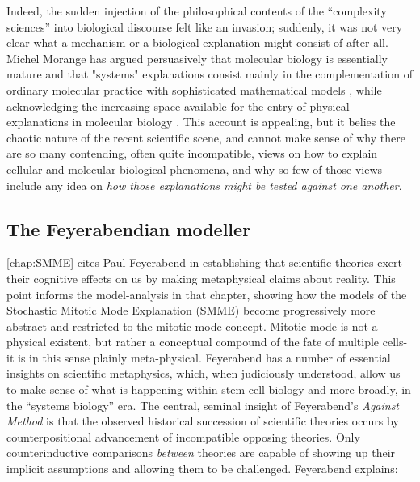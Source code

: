 Indeed, the sudden injection of the philosophical contents of the ``complexity sciences'' into biological discourse felt like an invasion; suddenly, it was not very clear what a mechanism or a biological explanation might consist of after all. Michel Morange has argued persuasively that molecular biology is essentially mature \cite{Morange2003} and that "systems" explanations consist mainly in the complementation of ordinary molecular practice with sophisticated mathematical models \cite{Morange2008}, while acknowledging the increasing space available for the entry of physical explanations in molecular biology \cite{Morange2011}. This account is appealing, but it belies the chaotic nature of the recent scientific scene, and cannot make sense of why there are so many contending, often quite incompatible, views on how to explain cellular and molecular biological phenomena, and why so few of those views include any idea on \textit{how those explanations might be tested against one another}.

\subsection{The Feyerabendian modeller}
\label{sec:Feyerabend}
\autoref{chap:SMME} cites Paul Feyerabend in establishing that scientific theories exert their cognitive effects on us by making metaphysical claims about reality. This point informs the model-analysis in that chapter, showing how the models of the Stochastic Mitotic Mode Explanation (SMME) become progressively more abstract and restricted to the mitotic mode concept. Mitotic mode is not a physical existent, but rather a conceptual compound of the fate of multiple cells- it is in this sense plainly meta-physical. Feyerabend has a number of essential insights on scientific metaphysics, which, when judiciously understood, allow us to make sense of what is happening within stem cell biology and more broadly, in the ``systems biology'' era. The central, seminal insight of Feyerabend's \textit{Against Method} is that the observed historical succession of scientific theories occurs by counterpositional advancement of incompatible opposing theories. Only counterinductive comparisons \textit{between} theories are capable of showing up their implicit assumptions and allowing them to be challenged. Feyerabend explains:

